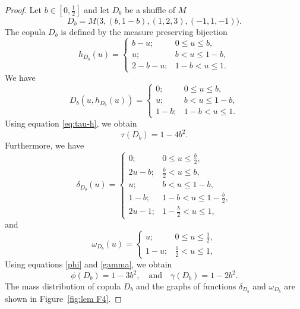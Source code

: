 \documentclass[12pt,a4paper]{amsart}
\theoremstyle{definition}
\begin{document}
\begin{proof}
Let $b \in [0, \tfrac12]$  and let $D_b$ be a shuffle of $M$
$$D_b = M\big(3, (b, 1-b), (1, 2, 3), (-1, 1, -1)\big).$$
The copula $D_b$ is defined by the measure preserving bijection 
$$ h_{D_b}(u) =  \begin{cases}
            b - u; &  0 \le u \le b, \\
            u; & b < u \le 1-b, \\
            2 - b - u; &  1-b < u \le 1.
            \end{cases}
$$
We have 
$$ D_b(u,h_{D_b}(u)) =  \begin{cases}
            0; &  0 \le u \le b, \\
            u; &  b < u \le 1-b, \\
            1-b; &  1 - b < u \le 1.
            \end{cases}
$$
Using equation \eqref{eq:tau-h}, we obtain
$$  \tau(D_b) = 1-4b^2. $$
Furthermore, we have
$$ \delta_{D_b}(u) =  \begin{cases}
            0; &  0 \le u \le \tfrac{b}{2}, \\
            2u - b; &  \tfrac{b}{2} < u \le b, \\
            u; & b < u \le 1-b, \\
            1-b; &  1-b < u \le 1-\tfrac{b}{2}, \\
            2u-1; &  1-\tfrac{b}{2} < u \le 1, 
            \end{cases}
$$
and
$$ \omega_{D_b}(u) =  \begin{cases}
            u; &  0 \le u \le \tfrac12, \\
            1-u; &  \tfrac12 < u \le 1, 
            \end{cases}
$$
Using equations \eqref{phi}  and \eqref{gamma}, we obtain
$$  \phi(D_b) = 1-3b^2, \quad \text{and} \quad \gamma(D_b) = 1- 2b^2. $$
The mass distribution of copula $D_b$ and the graphs of functions $\delta_{D_b}$ and $\omega_{D_b}$ are shown in Figure~\ref{fig:lem F4}.


\end{proof}
\end{document}
